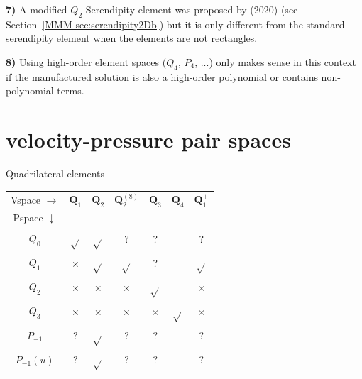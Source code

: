 \begin{remark}
{\bf 7)} A modified $Q_2$ Serendipity element was proposed by \textcite{zhxi20} (2020) 
(see Section~\ref{MMM-sec:serendipity2Db}) but it is only different from the standard serendipity 
element when the elements are not rectangles. 
\end{remark}

\begin{remark}
{\bf 8)} Using high-order element spaces ($Q_4$, $P_4$, ...) only makes 
sense in this context if the manufactured solution is also a high-order polynomial 
or contains non-polynomial terms.
\end{remark}


\newpage
\section*{velocity-pressure pair spaces}

\begin{center}
Quadrilateral elements\\
\begin{tabular}{ccccccc}
\hline
Vspace $\rightarrow$ & ${\bm Q}_1$  & ${\bm Q}_2$ & ${\bm Q}_2^{(8)}$ & ${\bm Q}_3$  & ${\bm Q}_4$ & ${\bm Q}_1^+$ \\ 
Pspace $\downarrow$ & \\
$Q_0$       & $\sqrt{}$ & $\sqrt{}$ & ?           & ?         &   & ?          \\
$Q_1$       & $\times$  & $\sqrt{}$ & $\sqrt{}$   & ?         &   & $\sqrt{}$  \\
$Q_2$       & $\times$  & $\times$  & $\times$    & $\sqrt{}$ &   & $\times$   \\
$Q_3$       & $\times$  & $\times$  & $\times$    & $\times$  & $\sqrt{}$ & $\times$ \\
$P_{-1}$    & ?         & $\sqrt{}$ & ?           & ?         &   & ?          \\
$P_{-1}(u)$ & ?         & $\sqrt{}$ & ?           & ?         &   & ?          \\
\hline
\end{tabular}
\end{center}

